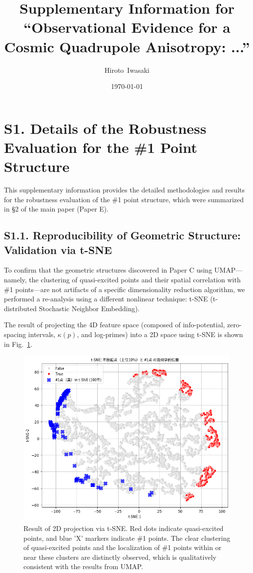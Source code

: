 \documentclass[a4paper,12pt]{article}
\begin{document}
\title{Supplementary Information for \\ ``Observational Evidence for a Cosmic Quadrupole Anisotropy: ...''}
\author{Hiroto~Iwasaki}
\date{\today}
\maketitle

\section*{S1. Details of the Robustness Evaluation for the \#1 Point Structure}
\label{sec:supp_robustness}

This supplementary information provides the detailed methodologies and results for the robustness evaluation of the \#1 point structure, which were summarized in §2 of the main paper (Paper E).

\subsection*{S1.1. Reproducibility of Geometric Structure: Validation via t-SNE}
\label{subsec:supp_geometry}

To confirm that the geometric structures discovered in Paper C using UMAP—namely, the clustering of quasi-excited points and their spatial correlation with \#1 points—are not artifacts of a specific dimensionality reduction algorithm, we performed a re-analysis using a different nonlinear technique: t-SNE (t-distributed Stochastic Neighbor Embedding).

The result of projecting the 4D feature space (composed of info-potential, zero-spacing intervals, $\kappa(p)$, and log-primes) into a 2D space using t-SNE is shown in Fig.~\ref{fig:supp_tsne_projection}.

\begin{figure}[H]
    \centering
    \includegraphics[width=0.8\linewidth]{S1_tsne_projection_robustness.png}
    \caption{Result of 2D projection via t-SNE. Red dots indicate quasi-excited points, and blue 'X' markers indicate \#1 points. The clear clustering of quasi-excited points and the localization of \#1 points within or near these clusters are distinctly observed, which is qualitatively consistent with the results from UMAP.}
    \label{fig:supp_tsne_projection}
\end{figure}
\end{document}
